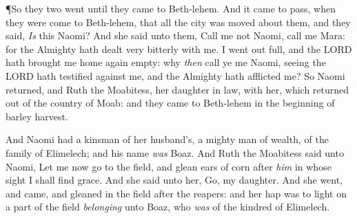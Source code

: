 \documentclass[11pt,letterpaper,oneside]{memoir}
\begin{document}
\P So they two went until they came to Beth-lehem. And it came to
pass, when they were come to Beth-lehem, that all the city was moved
about them, and they said, \emph{Is} this Naomi?  And she said unto
them, Call me not Naomi, call me Mara: for the Almighty hath dealt
very bitterly with me.  I went out full, and the \textsc{LORD} hath
brought me home again empty: why \emph{then} call ye me Naomi, seeing
the \textsc{LORD} hath testified against me, and the Almighty hath
afflicted me?  So Naomi returned, and Ruth the Moabitess, her daughter
in law, with her, which returned out of the country of Moab: and they
came to Beth-lehem in the beginning of barley harvest.

And Naomi had a kinsman of her husband's, a mighty man of wealth, of
the family of Elimelech; and his name \emph{was} Boaz.  And Ruth the
Moabitess said unto Naomi, Let me now go to the field, and glean ears
of corn after \emph{him} in whose sight I shall find grace. And she
said unto her, Go, my daughter.  And she went, and came, and gleaned
in the field after the reapers: and her hap was to light on a part of
the field \emph{belonging} unto Boaz, who \emph{was} of the kindred of
Elimelech.
\end{document}
